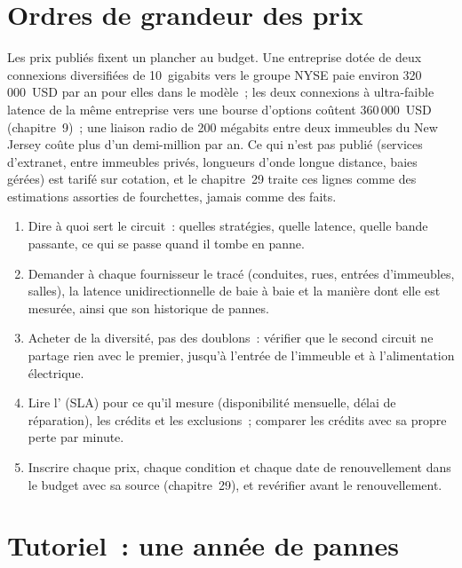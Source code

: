 \section{Ordres de grandeur des prix}

Les prix publiés fixent un plancher au budget. Une entreprise dotée de deux connexions diversifiées de 10~gigabits vers le groupe NYSE paie environ 320\,000~USD par an
pour elles dans le modèle~; les deux connexions à ultra-faible latence de la même entreprise vers une bourse d'options coûtent 360\,000~USD (chapitre~9)~; une liaison radio de 200
mégabits entre deux immeubles du New Jersey coûte plus d'un demi-million par an. Ce qui n'est pas publié (services d'extranet,  entre
immeubles privés, longueurs d'onde longue distance, baies gérées) est tarifé sur cotation, et le chapitre~29 traite ces lignes comme des estimations assorties de fourchettes, jamais comme
des faits.

\begin{method}\label{met:nw:buying-connectivity:buy}
\begin{enumerate}
\item Dire à quoi sert le circuit~: quelles stratégies, quelle latence, quelle bande passante, ce qui se passe quand il tombe en panne.
\item Demander à chaque fournisseur le tracé (conduites, rues, entrées d'immeubles, salles), la latence unidirectionnelle de baie à baie et la manière dont elle est mesurée, ainsi que son
  historique de pannes.
\item Acheter de la diversité, pas des doublons~: vérifier que le second circuit ne partage rien avec le premier, jusqu'à l'entrée de l'immeuble et à l'alimentation électrique.
\item Lire l' (SLA) pour ce qu'il mesure (disponibilité mensuelle, délai de réparation), les crédits et les exclusions~; comparer les crédits avec sa propre perte par
  minute.
\item Inscrire chaque prix, chaque condition et chaque date de renouvellement dans le budget avec sa source (chapitre~29), et revérifier avant le renouvellement.
\end{enumerate}
\end{method}

\section{Tutoriel~: une année de pannes}\label{tut:nw:buying-connectivity:tut}

